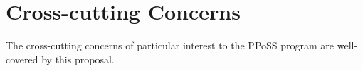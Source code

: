 
\section{Cross-cutting Concerns}



The cross-cutting concerns of particular interest to the PPoSS program are well-covered by this proposal.

